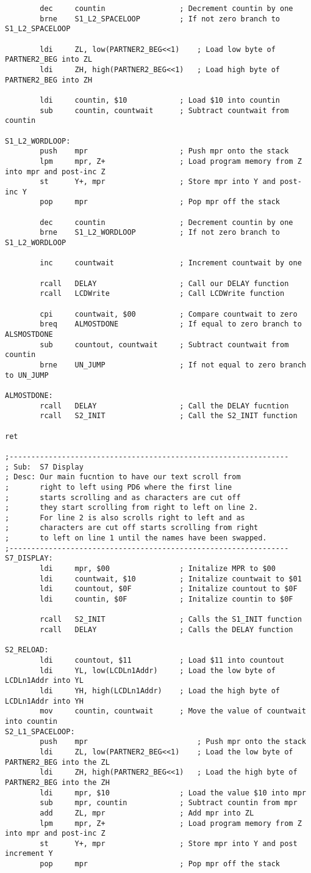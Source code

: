 \documentclass[12pt, letterpaper]{article}
\begin{document}
\begin{verbatim}
		dec		countin					; Decrement countin by one
		brne	S1_L2_SPACELOOP			; If not zero branch to S1_L2_SPACELOOP

		ldi		ZL, low(PARTNER2_BEG<<1)	; Load low byte of PARTNER2_BEG into ZL
		ldi		ZH, high(PARTNER2_BEG<<1)	; Load high byte of PARTNER2_BEG into ZH

		ldi		countin, $10			; Load $10 into countin
		sub		countin, countwait		; Subtract countwait from countin

S1_L2_WORDLOOP:
		push	mpr						; Push mpr onto the stack
		lpm		mpr, Z+					; Load program memory from Z into mpr and post-inc Z
		st		Y+, mpr					; Store mpr into Y and post-inc Y
		pop		mpr						; Pop mpr off the stack

		dec		countin					; Decrement countin by one
		brne	S1_L2_WORDLOOP			; If not zero branch to S1_L2_WORDLOOP

		inc		countwait				; Increment countwait by one

		rcall	DELAY					; Call our DELAY function
		rcall	LCDWrite				; Call LCDWrite function

		cpi		countwait, $00			; Compare countwait to zero
		breq	ALMOSTDONE				; If equal to zero branch to ALSMOSTDONE
		sub		countout, countwait		; Subtract countwait from countin
		brne	UN_JUMP					; If not equal to zero branch to UN_JUMP

ALMOSTDONE:
		rcall	DELAY					; Call the DELAY fucntion
		rcall	S2_INIT					; Call the S2_INIT function

ret

;----------------------------------------------------------------
; Sub:	S7 Display
; Desc:	Our main fucntion to have our text scroll from
;		right to left using PD6 where the first line
;		starts scrolling and as characters are cut off
;		they start scrolling from right to left on line 2.
;       For line 2 is also scrolls right to left and as
;		characters are cut off starts scrolling from right
;		to left on line 1 until the names have been swapped.
;----------------------------------------------------------------
S7_DISPLAY:
		ldi		mpr, $00				; Initalize MPR to $00
		ldi		countwait, $10			; Initalize countwait to $01
		ldi		countout, $0F			; Initalize countout to $0F
		ldi		countin, $0F			; Initalize countin to $0F
		
		rcall	S2_INIT					; Calls the S1_INIT function
		rcall	DELAY					; Calls the DELAY function

S2_RELOAD:
		ldi		countout, $11			; Load $11 into countout
		ldi		YL, low(LCDLn1Addr)		; Load the low byte of LCDLn1Addr into YL
		ldi		YH, high(LCDLn1Addr)	; Load the high byte of LCDLn1Addr into YH
		mov		countin, countwait		; Move the value of countwait into countin
S2_L1_SPACELOOP:
		push	mpr							; Push mpr onto the stack
		ldi		ZL, low(PARTNER2_BEG<<1)	; Load the low byte of PARTNER2_BEG into the ZL
		ldi		ZH, high(PARTNER2_BEG<<1)	; Load the high byte of PARTNER2_BEG into the ZH
		ldi		mpr, $10				; Load the value $10 into mpr
		sub		mpr, countin			; Subtract countin from mpr
		add		ZL,	mpr					; Add mpr into ZL
		lpm		mpr, Z+					; Load program memory from Z into mpr and post-inc Z
		st		Y+, mpr					; Store mpr into Y and post increment Y
		pop		mpr						; Pop mpr off the stack


\end{verbatim}
\end{document}
